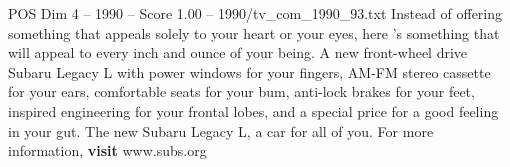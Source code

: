 \begin{textsample}{POS Dim 4 – 1990 – Score 1.00 – 1990/tv\_com\_1990\_93.txt}  \label{ex:f4_pos_027}
Instead of offering something that appeals solely to your heart or your eyes, here 's something that will appeal to every inch and ounce of your being.
A new front-wheel drive Subaru Legacy L with power windows for your fingers, AM-FM stereo cassette for your ears, comfortable seats for your bum, anti-lock brakes for your feet, inspired engineering for your frontal lobes, and a special price for a good feeling in your gut.
The new Subaru Legacy L, a car for all of you.
For more information, \textbf{visit} www.subs.org

\end{textsample}

